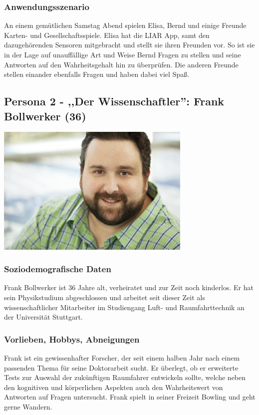 \documentclass[10pt, a4paper, oneside, titlepage]{scrartcl} %
\begin{document}
	\subsubsection{Anwendungsszenario}
	An einem gemütlichen Samstag Abend spielen Elisa, Bernd und einige Freunde Karten- und Gesellschaftsspiele. Elisa hat die LIAR App, samt den dazugehörenden Sensoren mitgebracht und stellt sie ihren Freunden vor. So ist sie in der Lage auf unauffällige Art und Weise Bernd Fragen zu stellen und seine Antworten auf den Wahrheitsgehalt hin zu überprüfen. Die anderen Freunde stellen einander ebenfalls Fragen und haben dabei viel Spaß.
   
   	\subsection{Persona 2 - ,,Der Wissenschaftler'': Frank Bollwerker (36)}
   	\begin{center}
		\includegraphics[width=0.7\textwidth]{persona_02.jpg}
	\end{center}
	\subsubsection{Soziodemografische Daten}
	Frank Bollwerker ist 36 Jahre alt, verheiratet und zur Zeit noch kinderlos. Er hat sein Physikstudium abgeschlossen und arbeitet seit dieser Zeit als wissenschaftlicher Mitarbeiter im Studiengang Luft- und Raumfahrttechnik an der Universität Stuttgart.
	\subsubsection{Vorlieben, Hobbys, Abneigungen}
	Frank ist ein gewissenhafter Forscher, der seit einem halben Jahr nach einem passenden Thema für seine Doktorarbeit sucht. Er überlegt, ob er erweiterte Tests zur Auswahl der zukünftigen Raumfahrer entwickeln sollte, welche neben den kognitiven und körperlichen Aspekten auch den Wahrheitswert von Antworten auf Fragen untersucht. Frank spielt in seiner Freizeit Bowling und geht gerne Wandern.
\end{document}
